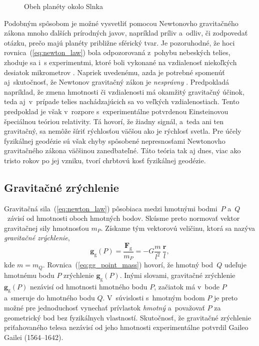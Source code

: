 \documentclass[a4paper,12pt]{book}
\newcommand{\gidx}{\mathrm g}
\let\vec\mathbf
\begin{document}
\begin{figure}
\centering

\caption{Obeh planéty okolo Slnka}
\label{fig:orbital_motion}
\end{figure}

Podobným spôsobom je možné vysvetliť pomocou Newtonovho gravitačného zákona 
mnoho ďalších prírodných javov, napríklad príliv a~odliv, či zodpovedať otázku, 
prečo majú planéty približne sférický tvar.  Je pozoruhodné, že hoci 
rovnica~(\ref{eq:newton_law}) bola odpozorovaná z~pohybu nebeských telies, 
zhoduje sa i~s experimentmi, ktoré boli vykonané na vzdialenosť niekoľkých 
desiatok mikrometrov \parencite{Lee2020}.  Napriek uvedenému, azda je potrebné 
spomenúť aj~skutočnosť, že Newtonov gravitačný zákon je \emph{nesprávny} 
\parencite{Feynman}.  Predpokladá napríklad, že zmena hmotnosti či vzdialenosti 
má okamžitý gravitačný účinok, teda aj~v~prípade telies nachádzajúcich sa vo 
veľkých vzdialenostiach.  Tento predpoklad je však v~rozpore s~experimentálne 
potvrdenou Einsteinovou špeciálnou teóriou relativity.  Tá hovorí, že žiadny 
signál, a~teda ani ten gravitačný, sa nemôže šíriť rýchlosťou väčšou ako je 
rýchlosť svetla.  Pre účely fyzikálnej geodézie sú však chyby spôsobené 
nepresnosťami Newtonovho gravitačného zákona väčšinou zanedbateľné.  Táto 
teória tak aj dnes, viac ako tristo rokov po jej vzniku, tvorí chrbtovú kosť 
fyzikálnej geodézie.






\subsection{Gravitačné zrýchlenie}
\label{sec:gg}

Gravitačná sila~(\ref{eq:newton_law}) pôsobiaca medzi hmotnými bodmi~$P$ 
a~$Q$~závisí od hmotnosti oboch hmotných bodov.  Skúsme preto normovať vektor 
gravitačnej sily hmotnosťou $m_P$.  Získame tým vektorovú veličinu, ktorá sa 
nazýva \emph{gravitačné zrýchlenie},
%
\begin{equation}
\label{eq:gg_point_mass}
\vec g_\gidx(P) = \frac{\vec F_\gidx}{m_P} = -G \frac{m}{l^2} \, \frac{\vec
r}{l}{,}
\end{equation}
%
kde $m = m_Q$.  Rovnica~(\ref{eq:gg_point_mass}) hovorí, že hmotný
bod~$Q$ udeľuje hmotnému bodu $P$ zrýchlenie $\vec g_\gidx(P)$.   Inými
slovami, gravitačné zrýchlenie $\vec g_\gidx(P)$ nezávisí od hmotnosti hmotného
bodu $P$, začiatok má v~bode $P$ a~smeruje do hmotného bodu $Q$.  V~súvislosti
s~hmotným bodom $P$ je preto možné pre jednoduchosť vynechať prívlastok
\emph{hmotný} a~považovať $P$ za geometrický bod bez fyzikálnych vlastností.
Skutočnosť, že gravitačné zrýchlenie priťahovaného telesa nezávisí od jeho
hmotnosti experimentálne potvrdil Gaileo Gailei (1564--1642).
\end{document}
